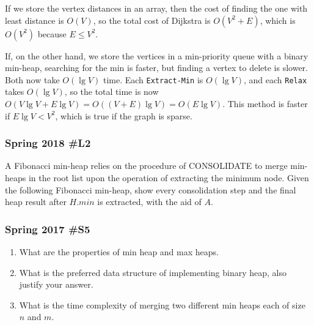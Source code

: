 If we store the vertex distances in an array, then the cost of finding the one with least distance is $O(V)$, so the total cost of Dijkstra is $O(V^2 + E)$, which is $O(V^2)$ because $E \le V^2$.  

If, on the other hand, we store the vertices in a min-priority queue with a binary min-heap, searching for the min is faster, but finding a vertex to delete is slower.  Both now take $O(\lg V)$ time.  Each \verb|Extract-Min| is $O(\lg V)$, and each \verb|Relax| takes $O(\lg V)$, so the total time is now $O(V \lg V + E \lg V) = O((V+E) \lg V) = O(E \lg V)$.  This method is faster if $E \lg V < V^2$, which is true if the graph is sparse.  


\subsubsection{Spring 2018 \#L2}
	A Fibonacci min-heap relies on the procedure of CONSOLIDATE to merge min-heaps in the root list upon the operation of extracting the minimum node.  Given the following Fibonacci min-heap, show every consolidation step and the final heap result after $H.min$ is extracted, with the aid of $A$.  
	
	
\hfil {}	

\subsubsection{Spring 2017 \#S5}
	\begin{enumerate}[label=\alph*.]
		\item What are the properties of min heap and max heaps.
		\item What is the preferred data structure of implementing binary heap, also justify your answer.
		\item What is the time complexity of merging two different min heaps each of size $n$ and $m$.
	\end{enumerate}
	
